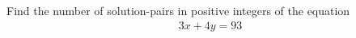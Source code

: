 Find the number of solution-pairs in positive integers of the equation
\begin{align*}
3x + 4y = 93
\end{align*}